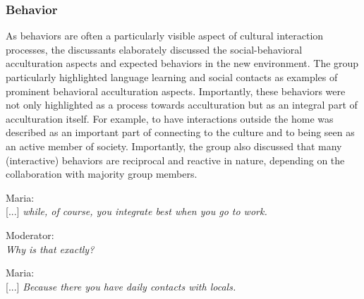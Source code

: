 \documentclass[man, 12pt, a4paper]{apa7}
\begin{document}
\subsubsection{Behavior}
As behaviors are often a particularly visible aspect of cultural interaction processes, the discussants elaborately discussed the social-behavioral acculturation aspects and expected behaviors in the new environment. The group particularly highlighted language learning and social contacts as examples of prominent behavioral acculturation aspects. Importantly, these behaviors were not only highlighted as a process towards acculturation but as an integral part of acculturation itself. For example, to have interactions outside the home was described as an important part of connecting to the culture and to being seen as an active member of society. Importantly, the group also discussed that many (interactive) behaviors are reciprocal and reactive in nature, depending on the collaboration with majority group members.
\begin{displayquote}
    Maria:\\
    {[...]} \textit{while, of course, you integrate best when you go to work.}
    
    Moderator:\\
    \textit{Why is that exactly?}
    
    Maria:\\
    {[...]} \textit{Because there you have daily contacts with locals.}
\end{displayquote}
\end{document}
